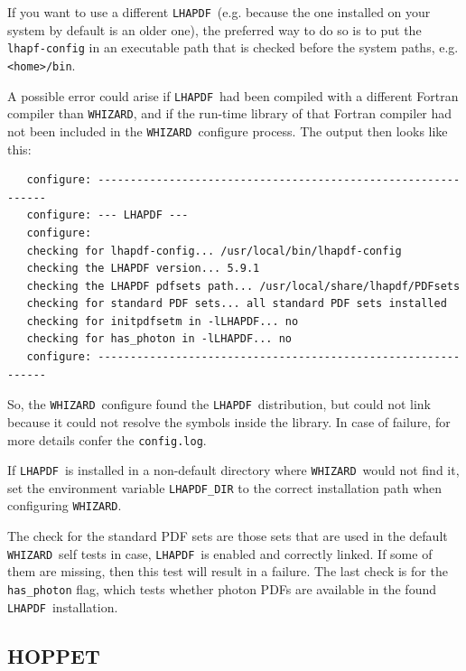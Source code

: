 \documentclass[12pt]{book}
\newcommand{\ttt}[1]{\texttt{#1}}
\newcommand{\whizard}{\texttt{WHIZARD}}
\newcommand{\lhapdf}{\texttt{LHAPDF}}
\begin{document}
If you want to use a different \lhapdf\ (e.g. because the one installed
on your system by default is an older one), the preferred way to do so
is to put the \ttt{lhapf-config} in an executable path that is checked
before the system paths, e.g. \ttt{<home>/bin}. 

A possible error could arise if \lhapdf\ had been compiled with a
different Fortran compiler than \whizard, and if the run-time library
of that Fortran compiler had not been included in the \whizard\
configure process. The output then looks like this:

\begin{footnotesize}
\begin{verbatim}
   configure: --------------------------------------------------------------
   configure: --- LHAPDF ---
   configure:
   checking for lhapdf-config... /usr/local/bin/lhapdf-config
   checking the LHAPDF version... 5.9.1
   checking the LHAPDF pdfsets path... /usr/local/share/lhapdf/PDFsets
   checking for standard PDF sets... all standard PDF sets installed
   checking for initpdfsetm in -lLHAPDF... no
   checking for has_photon in -lLHAPDF... no
   configure: --------------------------------------------------------------
\end{verbatim}
\end{footnotesize}

So, the \whizard\ configure found the \lhapdf\ distribution, but could
not link because it could not resolve the symbols inside the
library. In case of failure, for more details confer the
\ttt{config.log}. 

If \lhapdf\ is installed in a non-default directory where
\whizard\ would not find it, set the environment variable
\ttt{LHAPDF\_DIR} to the correct installation path when configuring
\whizard.

The check for the standard PDF sets are those sets that are used in
the default \whizard\ self tests in case, \lhapdf\ is enabled and
correctly linked. If some of them are missing, then this test will
result in a failure. The last check is for the \ttt{has\_photon} flag,
which tests whether photon PDFs are available in the found \lhapdf\
installation. 


\subsection{HOPPET}
\label{sec:hoppet}
\end{document}

